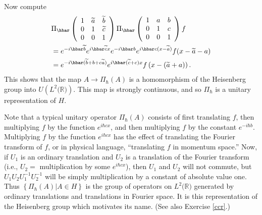 \documentclass{amsbook}
\theoremstyle{plain}
\numberwithin{equation}{chapter}
\numberwithin{theorem}{chapter}
\begin{document}
Now compute
\begin{align*}
& \Pi_{\hbar}\left(
\begin{array}
[c]{ccc}%
1 & \widetilde{a} & \widetilde{b}\\
0 & 1 & \widetilde{c}\\
0 & 0 & 1
\end{array}
\right)  \Pi_{\hbar}\left(
\begin{array}
[c]{ccc}%
1 & a & b\\
0 & 1 & c\\
0 & 0 & 1
\end{array}
\right)  f\\
& =e^{-i\hbar\widetilde{b}}e^{i\hbar\widetilde{c}x}e^{-i\hbar b}e^{i\hbar
c(x-\widetilde{a})}f(x-\widetilde{a}-a)\\
& =e^{-i\hbar(\widetilde{b}+b+c\widetilde{a})}e^{i\hbar(\widetilde{c}%
+c)x}f\left(  x-(\widetilde{a}+a)\right)  \text{.}%
\end{align*}
This shows that the map $A\rightarrow\Pi_{\hbar}(A)$ is a homomorphism of the
Heisenberg group into $U\left(  L^{2}(\mathbb{R}\mathbf{)}\right)  $. This map
is strongly continuous, and so $\Pi_{\hbar}$ is a unitary representation of
$H$.

Note that a typical unitary operator $\Pi_{\hbar}(A)$ consists of first
translating $f$, then multiplying $f$ by the function $e^{i\hbar cx}$, and
then multiplying $f$ by the constant $e^{-i\hbar b}$. Multiplying $f$ by the
function $e^{i\hbar cx}$ has the effect of translating the Fourier transform
of $f$, or in physical language, ``translating $f$ in momentum space.'' Now,
if $U_{1}$ is an ordinary translation and $U_{2}$ is a translation of the
Fourier transform (i.e., $U_{2}=$ multiplication by some $e^{i\hbar cx}$),
then $U_{1}$ and $U_{2}$ will not commute, but $U_{1}U_{2}U_{1}^{-1}U_{2}%
^{-1}$ will be simply multiplication by a constant of absolute value one. Thus
$\left\{  \Pi_{\hbar}(A)\left|  A\in H\right.  \right\}  $ is the group of
operators on $L^{2}(\mathbb{R}\mathbf{)}$ generated by ordinary translations
and translations in Fourier space. It is this representation of the Heisenberg
group which motivates its name. (See also Exercise \ref{ccr}.)
\end{document}
